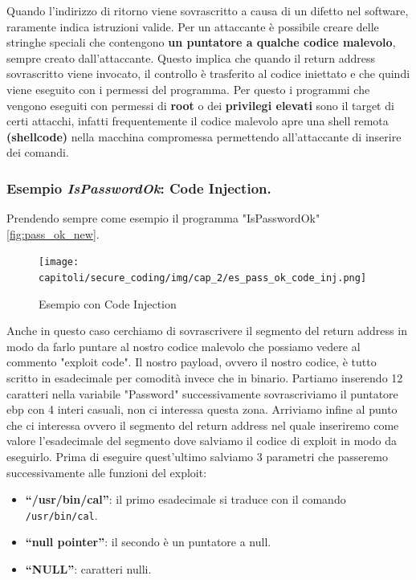 Quando l'indirizzo di ritorno viene sovrascritto a causa di un difetto nel software,
raramente indica istruzioni valide. Per un attaccante è possibile creare delle
stringhe speciali che contengono \textbf{un puntatore a qualche codice malevolo},
sempre creato dall'attaccante. Questo implica che quando il return address sovrascritto
viene invocato, il controllo è trasferito al codice iniettato e che quindi viene
eseguito con i permessi del programma. Per questo i programmi che vengono eseguiti
con permessi di \textbf{root} o dei \textbf{privilegi elevati} sono il target di
certi attacchi, infatti frequentemente il codice malevolo apre una shell remota
\textbf{(shellcode)} nella macchina compromessa permettendo all'attaccante di inserire
dei comandi.

\subsubsection{Esempio \textit{IsPasswordOk}: Code Injection.}

Prendendo sempre come esempio il programma "IsPasswordOk" \ref{fig:pass_ok_new}.

\begin{figure}[H]
    \centering
    \texttt{[image: capitoli/secure\_coding/img/cap\_2/es\_pass\_ok\_code\_inj.png]}
    \caption{Esempio con Code Injection}\label{fig:es_pass_ok_code_inj}
\end{figure}

Anche in questo caso cerchiamo di sovrascrivere il segmento del return address in modo
da farlo puntare al nostro codice malevolo che possiamo vedere al commento "exploit code".
Il nostro payload, ovvero il nostro codice, è tutto scritto in esadecimale per comodità
invece che in binario. Partiamo inserendo 12 caratteri nella variabile "Password"
successivamente sovrascriviamo il puntatore ebp con 4 interi casuali, non ci interessa
questa zona. Arriviamo infine al punto che ci interessa ovvero il segmento del return
address nel quale inseriremo come valore l'esadecimale del segmento dove salviamo
il codice di exploit in modo da eseguirlo. Prima di eseguire quest'ultimo salviamo 3
parametri che passeremo successivamente alle funzioni del exploit:

\begin{itemize}
    \item \textbf{``/usr/bin/cal''}: il primo esadecimale si traduce con il
          comando \verb|/usr/bin/cal|.
    \item \textbf{``null pointer''}: il secondo è un puntatore a null.
    \item \textbf{``NULL''}: caratteri nulli.
\end{itemize}

